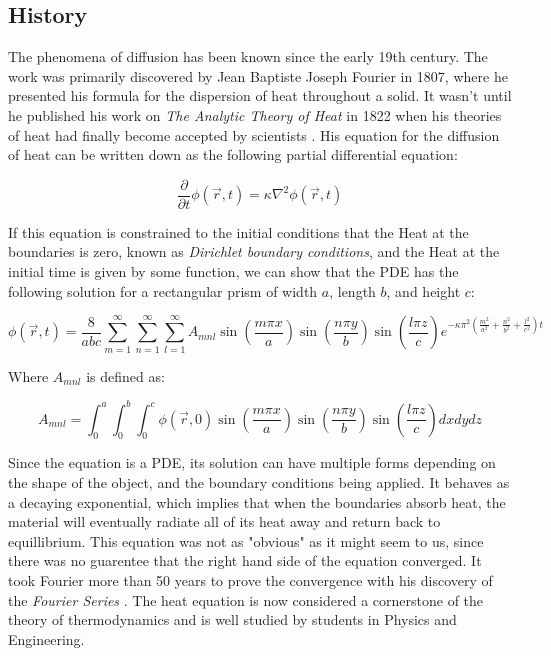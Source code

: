 \documentclass[letterpaper, 12pt]{article}
\begin{document}
      \subsection{History}
         The phenomena of diffusion has been known since the early 19th century. The work was primarily discovered by Jean Baptiste Joseph Fourier in 1807, where he presented his formula for the dispersion of heat throughout a solid. It wasn't until he published his work on \textit{The Analytic Theory of Heat} in 1822 when his theories of heat had finally become accepted by scientists \cite{History}. His equation for the diffusion of heat can be written down as the following partial differential equation:

         \begin{equation}
            \frac{\partial}{\partial t} \phi (\vec{r}, t) = \kappa \nabla^2 \phi (\vec{r}, t)
         \end{equation}

         If this equation is constrained to the initial conditions that the Heat at the boundaries is zero, known as \textit{Dirichlet boundary conditions}, and the Heat at the initial time is given by some function, we can show that the PDE has the following solution for a rectangular prism of width $a$, length $b$, and height $c$:

         \begin{equation}
            \phi (\vec{r}, t) = \frac{8}{abc} \sum_{m=1}^\infty \sum_{n=1}^\infty \sum_{l = 1}^\infty  A_{mnl} \sin \left( \frac{m \pi x}{a} \right) \sin \left( \frac{n \pi y}{b} \right) \sin \left( \frac{l \pi z}{c} \right) e^{-\kappa \pi^2 \left( \frac{m^2}{a^2} + \frac{n^2}{b^2} + \frac{l^2}{c^2}\right) t}
         \end{equation}

         Where $ A_{mnl}$ is defined as:

         \begin{equation}
            A_{mnl} = \int_0^a \int_0^b \int_0^c \phi (\vec{r}, 0) \sin \left( \frac{m \pi x}{a} \right) \sin \left( \frac{n \pi y}{b} \right) \sin \left( \frac{l \pi z}{c} \right)dx dy dz
         \end{equation}

         Since the equation is a PDE, its solution can have multiple forms depending on the shape of the object, and the boundary conditions being applied. It behaves as a decaying exponential, which implies that when the boundaries absorb heat, the material will eventually radiate all of its heat away and return back to equillibrium. This equation was not as "obvious" as it might seem to us, since there was no guarentee that the right hand side of the equation converged. It took Fourier more than 50 years to prove the convergence with his discovery of the \textit{Fourier Series} \cite{History}. The heat equation is now considered a cornerstone of the theory of thermodynamics and is well studied by students in Physics and Engineering.\\
\end{document}
